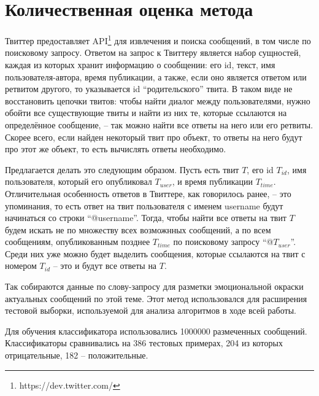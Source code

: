 \section{Количественная оценка метода}\label{compare}

Твиттер предоставляет API\footnote{https://dev.twitter.com/} для извлечения и поиска сообщений, в
том числе по поисковому запросу. Ответом на запрос к Твиттеру является набор сущностей, каждая из
которых хранит информацию о сообщении: его id, текст, имя пользователя-автора,
время публикации, а также, если оно является ответом или ретвитом другого, то указывается id
``родительского'' твита. В таком виде не восстановить цепочки твитов: чтобы найти диалог
между пользователями, нужно обойти все существующие твиты и найти из них те, которые ссылаются на
определённое сообщение, -- так можно найти все ответы на него или его ретвиты. Скорее всего, если
найден некоторый твит про объект, то ответы на него будут про этот же объект, то есть вычислять
ответы необходимо.

Предлагается делать это следующим образом. Пусть есть твит $T$, его id $T_{id}$, имя пользователя,
который его опубликовал $T_{user}$, и время публикации $T_{time}$. Отличительная особенность ответов
в Твиттере, как говорилось ранее, -- это упоминания, то есть ответ на твит пользователя с именем username
будут начинаться со строки ``@username''. Тогда, чтобы найти все ответы на твит $T$ будем искать не
по множеству всех возможнных сообщений, а по всем сообщениям, опубликованным позднее $T_{time}$ по
поисковому запросу ``@$T_{user}$''. Среди них уже можно будет выделить сообщения, которые ссылаются
на твит с номером $T_{id}$ -- это и будут все ответы на $T$.

Так собираются данные по слову-запросу для разметки эмоциональной окраски актуальных сообщений по
этой теме. Этот метод использовался для расширения тестовой выборки, используемой для анализа
алгоритмов в ходе всей работы.

Для обучения классификатора использовались 1000000 размеченных сообщений. Классификаторы сравнивались
на 386 тестовых примерах, 204 из которых отрицательные, 182 -- положительные.

